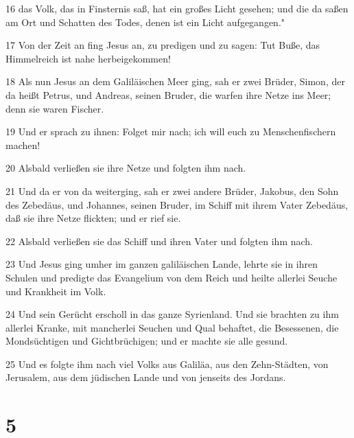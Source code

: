 \par 16 das Volk, das in Finsternis saß, hat ein großes Licht gesehen; und die da saßen am Ort und Schatten des Todes, denen ist ein Licht aufgegangen."
\par 17 Von der Zeit an fing Jesus an, zu predigen und zu sagen: Tut Buße, das Himmelreich ist nahe herbeigekommen!
\par 18 Als nun Jesus an dem Galiläischen Meer ging, sah er zwei Brüder, Simon, der da heißt Petrus, und Andreas, seinen Bruder, die warfen ihre Netze ins Meer; denn sie waren Fischer.
\par 19 Und er sprach zu ihnen: Folget mir nach; ich will euch zu Menschenfischern machen!
\par 20 Alsbald verließen sie ihre Netze und folgten ihm nach.
\par 21 Und da er von da weiterging, sah er zwei andere Brüder, Jakobus, den Sohn des Zebedäus, und Johannes, seinen Bruder, im Schiff mit ihrem Vater Zebedäus, daß sie ihre Netze flickten; und er rief sie.
\par 22 Alsbald verließen sie das Schiff und ihren Vater und folgten ihm nach.
\par 23 Und Jesus ging umher im ganzen galiläischen Lande, lehrte sie in ihren Schulen und predigte das Evangelium von dem Reich und heilte allerlei Seuche und Krankheit im Volk.
\par 24 Und sein Gerücht erscholl in das ganze Syrienland. Und sie brachten zu ihm allerlei Kranke, mit mancherlei Seuchen und Qual behaftet, die Besessenen, die Mondsüchtigen und Gichtbrüchigen; und er machte sie alle gesund.
\par 25 Und es folgte ihm nach viel Volks aus Galiläa, aus den Zehn-Städten, von Jerusalem, aus dem jüdischen Lande und von jenseits des Jordans.

\chapter{5}


